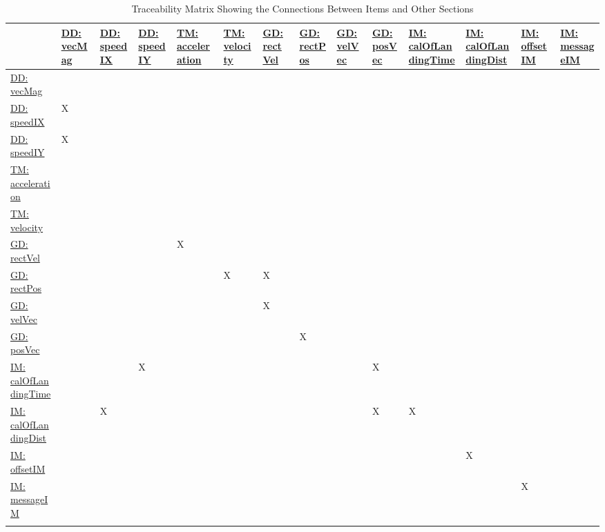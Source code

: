\documentclass[12pt]{article}
\begin{document}
\begin{longtable}{l l l l l l l l l l l l l l}
\toprule
\textbf{} & \textbf{\hyperref[DD:vecMag]{DD: vecMag}} & \textbf{\hyperref[DD:speedIX]{DD: speedIX}} & \textbf{\hyperref[DD:speedIY]{DD: speedIY}} & \textbf{\hyperref[TM:acceleration]{TM: acceleration}} & \textbf{\hyperref[TM:velocity]{TM: velocity}} & \textbf{\hyperref[GD:rectVel]{GD: rectVel}} & \textbf{\hyperref[GD:rectPos]{GD: rectPos}} & \textbf{\hyperref[GD:velVec]{GD: velVec}} & \textbf{\hyperref[GD:posVec]{GD: posVec}} & \textbf{\hyperref[IM:calOfLandingTime]{IM: calOfLandingTime}} & \textbf{\hyperref[IM:calOfLandingDist]{IM: calOfLandingDist}} & \textbf{\hyperref[IM:offsetIM]{IM: offsetIM}} & \textbf{\hyperref[IM:messageIM]{IM: messageIM}}
\\
\midrule
\endhead
\hyperref[DD:vecMag]{DD: vecMag} &  &  &  &  &  &  &  &  &  &  &  &  & 
\\
\hyperref[DD:speedIX]{DD: speedIX} & X &  &  &  &  &  &  &  &  &  &  &  & 
\\
\hyperref[DD:speedIY]{DD: speedIY} & X &  &  &  &  &  &  &  &  &  &  &  & 
\\
\hyperref[TM:acceleration]{TM: acceleration} &  &  &  &  &  &  &  &  &  &  &  &  & 
\\
\hyperref[TM:velocity]{TM: velocity} &  &  &  &  &  &  &  &  &  &  &  &  & 
\\
\hyperref[GD:rectVel]{GD: rectVel} &  &  &  & X &  &  &  &  &  &  &  &  & 
\\
\hyperref[GD:rectPos]{GD: rectPos} &  &  &  &  & X & X &  &  &  &  &  &  & 
\\
\hyperref[GD:velVec]{GD: velVec} &  &  &  &  &  & X &  &  &  &  &  &  & 
\\
\hyperref[GD:posVec]{GD: posVec} &  &  &  &  &  &  & X &  &  &  &  &  & 
\\
\hyperref[IM:calOfLandingTime]{IM: calOfLandingTime} &  &  & X &  &  &  &  &  & X &  &  &  & 
\\
\hyperref[IM:calOfLandingDist]{IM: calOfLandingDist} &  & X &  &  &  &  &  &  & X & X &  &  & 
\\
\hyperref[IM:offsetIM]{IM: offsetIM} &  &  &  &  &  &  &  &  &  &  & X &  & 
\\
\hyperref[IM:messageIM]{IM: messageIM} &  &  &  &  &  &  &  &  &  &  &  & X & 
\\
\bottomrule
\caption{Traceability Matrix Showing the Connections Between Items and Other Sections}
\label{Table:TraceMatRefvsRef}
\end{longtable}
\end{document}
